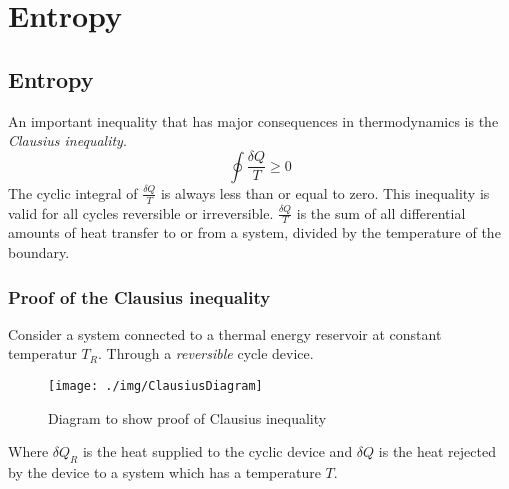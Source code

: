 \chapter{Entropy}
\section{Entropy}
An important inequality that has major consequences in thermodynamics is the \emph{Clausius inequality}.
\begin{equation}
  \oint \frac{\delta Q}{T} \geq 0
\end{equation}
The cyclic integral of \( \frac{\delta Q}{T} \) is always less than or equal to zero. This inequality is valid for all cycles reversible or irreversible. \( \frac{\delta Q}{T} \) is the sum of all differential amounts of heat transfer to or from a system, divided by the temperature of the boundary.
\subsection{Proof of the Clausius inequality}
Consider a system connected to a thermal energy reservoir at constant temperatur \( T_R \). Through a \emph{reversible} cycle device.
\begin{figure}
  \centering
  \texttt{[image: ./img/ClausiusDiagram]}
  \caption{Diagram to show proof of Clausius inequality}
\end{figure}
Where \( \delta Q_R \) is the heat supplied to the cyclic device and \( \delta Q \) is the heat rejected by the device to a system which has a temperature \(T\).

